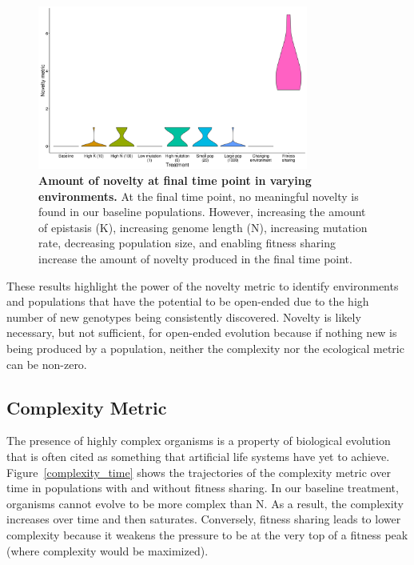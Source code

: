 \documentclass[letterpaper]{article}
\begin{document}
\begin{figure}
\includegraphics[width=3.5in]{figs/noveltyboxplots.png}
\caption{\textbf{Amount of novelty at final time point in varying environments.} At the final time point, no meaningful novelty is found in our baseline populations. However, increasing the amount of epistasis (K), increasing genome length (N), increasing mutation rate, decreasing population size, and enabling fitness sharing increase the amount of novelty produced in the final time point.}
\label{novelty}
\end{figure}

These results highlight the power of the novelty metric to identify environments and populations that have the potential to be open-ended due to the high number of new genotypes being consistently discovered. Novelty is likely necessary, but not sufficient, for open-ended evolution because if nothing new is being produced by a population, neither the complexity nor the ecological metric can be non-zero.

\subsection{Complexity Metric}
    The presence of highly complex organisms is a property of biological evolution that is often cited as something that artificial life systems have yet to achieve.  Figure~\ref{complexity_time} shows the trajectories of the complexity metric over time in populations with and without fitness sharing. In our baseline treatment, organisms cannot evolve to be more complex than N. As a result, the complexity increases over time and then saturates. Conversely, fitness sharing leads to lower complexity because it weakens the pressure to be at the very top of a fitness peak (where complexity would be maximized).
\end{document}

